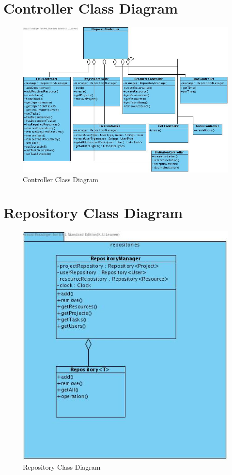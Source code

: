 	\section{Controller Class Diagram}
	\begin{figure}[H]
		\begin{center}
			\includegraphics[width=\textwidth]{images/ControllerClassDiagram.jpg}
		\end{center}
		\caption{Controller Class Diagram}
	\end{figure}
	\section{Repository Class Diagram}
	\begin{figure}[H]
		\begin{center}
			\includegraphics[scale=0.6]{images/RepositoriesClassDiagram.jpg}
		\end{center}
		\caption{Repository Class Diagram}
	\end{figure}

